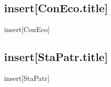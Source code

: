 \documentclass[a4paper]{article}
\newcommand{\SRE}[1]{insert[#1]}
\begin{document}

\subsection*{\SRE{ConEco.title}}
\SRE{ConEco}

\subsection*{\SRE{StaPatr.title}}
\SRE{StaPatr}
\end{document}
